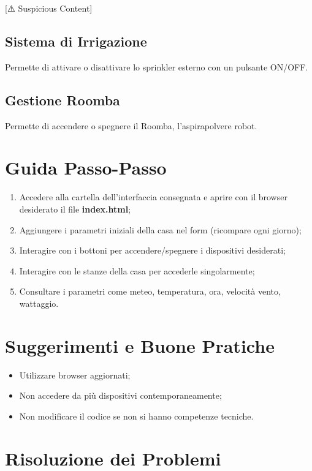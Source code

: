 [⚠️ Suspicious Content] \documentclass[a4paper,12pt]{article}
\begin{document}
\subsection*{Sistema di Irrigazione}
Permette di attivare o disattivare lo sprinkler esterno con un pulsante ON/OFF.

\subsection*{Gestione Roomba}
Permette di accendere o spegnere il Roomba, l'aspirapolvere robot.

\section{Guida Passo-Passo}

\begin{enumerate}
  \item Accedere alla cartella dell'interfaccia consegnata e aprire con il browser desiderato il file \textbf{index.html};
  \item Aggiungere i parametri iniziali della casa nel form (ricompare ogni giorno);
  \item Interagire con i bottoni per accendere/spegnere i dispositivi desiderati;
  \item Interagire con le stanze della casa per accederle singolarmente;
  \item Consultare i parametri come meteo, temperatura, ora, velocità vento, wattaggio.
\end{enumerate}

\section{Suggerimenti e Buone Pratiche}

\begin{itemize}
  \item Utilizzare browser aggiornati;
  \item Non accedere da più dispositivi contemporaneamente;
  \item Non modificare il codice se non si hanno competenze tecniche.
\end{itemize}

\section{Risoluzione dei Problemi}
\end{document}
